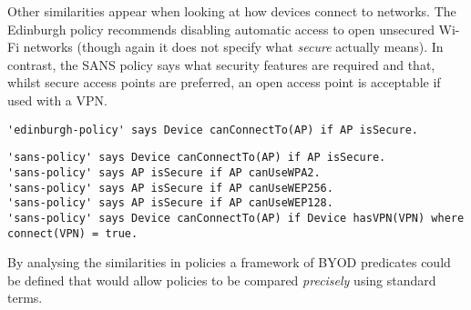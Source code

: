 \documentclass{easychair}
\begin{document}
Other similarities appear when looking at how devices connect to networks.
The Edinburgh policy recommends disabling automatic access to open unsecured Wi-Fi networks (though again it does not specify what \emph{secure} actually means). 
In contrast, the SANS policy says what security features are required and that, whilst secure access points are preferred, an open access point is acceptable if used with a VPN.
\begin{lstlisting}[title={\footnotesize\textbf{Edinburgh}:~\itshape ``Control your devices connections by disabling automatic connection to open, unsecured Wi-Fi networks.''}]
'edinburgh-policy' says Device canConnectTo(AP) if AP isSecure.
\end{lstlisting}
\begin{lstlisting}[title={\footnotesize\textbf{SANS}:~\itshape ``If mobile workers do require connectivity through public, open, or untrusted WLAN, then users MUST use WLANs using, if available and in this order: WPA(2) encryption, WEP 256 bits (or 128 bits), or finally open networks if nothing else is available. Users connected to data networks in an open environment MUST use a VPN connection.''}]
'sans-policy' says Device canConnectTo(AP) if AP isSecure.
'sans-policy' says AP isSecure if AP canUseWPA2.
'sans-policy' says AP isSecure if AP canUseWEP256.
'sans-policy' says AP isSecure if AP canUseWEP128.
'sans-policy' says Device canConnectTo(AP) if Device hasVPN(VPN) where connect(VPN) = true.
\end{lstlisting}
By analysing the similarities in policies a framework of BYOD predicates could be defined that would allow policies to be compared \emph{precisely} using standard terms.
\end{document}
